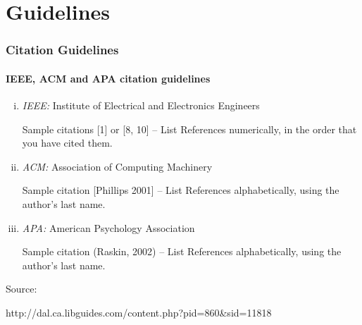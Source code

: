 \section{Guidelines}

\begin{frame}
    \frametitle{Citation Guidelines}
    \framesubtitle{IEEE, ACM and APA citation guidelines}
    \begin{enumerate}[i)]
    	\item \emph{IEEE: }  Institute of Electrical and Electronics Engineers
    	
Sample citations [1] or [8, 10] -- List References numerically, in the order that you have cited them.
    	
    	\item \emph{ACM: } Association of Computing Machinery
    	
Sample citation [Phillips 2001] -- List References alphabetically, using the author's last name.
    	\item \emph{APA: } American Psychology Association
    	
Sample citation (Raskin, 2002) -- List References alphabetically, using the author's last name.
    \end{enumerate} 
	Source:     
    
http://dal.ca.libguides.com/content.php?pid=860\&sid=11818    
    
    
\end{frame}

